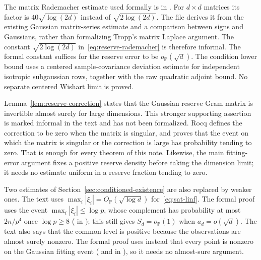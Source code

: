 \documentclass[11pt]{article}
\newcommand{\Pbb}{\mathbb P}
\newcommand{\OP}{O_{\Pbb}}
\newcommand{\oP}{o_{\Pbb}}
\theoremstyle{remark}
\begin{document}
The matrix Rademacher estimate used formally is
 in
. For $d\times d$
matrices its factor is $40\sqrt{\log(2d)}$ instead of
$\sqrt{2\log(2d)}$. The file derives it from the existing Gaussian
matrix-series estimate and a comparison between signs and Gaussians,
rather than formalizing Tropp's matrix Laplace argument. The constant
$\sqrt{2\log(2d)}$
in~\eqref{eq:reserve-rademacher} is therefore informal. The formal
constant suffices for the reserve error to be $o_{\Pbb}(\sqrt d)$.
The condition lower bound uses a centered sample-covariance deviation
estimate for independent isotropic subgaussian rows, together with the
raw quadratic adjoint bound. No separate centered Wishart limit is proved.

Lemma~\ref{lem:reserve-correction} states that the Gaussian reserve Gram
matrix is invertible almost surely for large dimensions. This stronger
supporting assertion is marked informal in the text and has not been
formalized. Rocq defines the correction to be zero when the matrix is
singular, and  proves that the event
on which the matrix is singular or the correction is large has
probability tending to zero. That is enough for every theorem
of this note. Likewise, the main fitting-error argument fixes a positive
reserve density before taking the dimension limit; it needs no estimate
uniform in a reserve fraction tending to zero.

Two estimates of Section~\ref{sec:conditioned-existence} are also
replaced by weaker ones. The text uses $\max_i|\xi_i|=\OP(\sqrt{\log d})$
for~\eqref{eq:sat-linf}. The formal proof uses the event
$\max_i|\xi_i|\le\log p$, whose complement has probability at most
$2n/p^4$ once $\log p\ge8$ ( in
); this still gives $S_d=\oP(1)$ when
$a_d=o(\sqrt d)$. The text also says that the common level is positive
because the observations are almost surely nonzero. The formal proof
uses instead that every point is nonzero on the Gaussian fitting event
( and
 in ), so it
needs no almost-sure argument.
\end{document}
